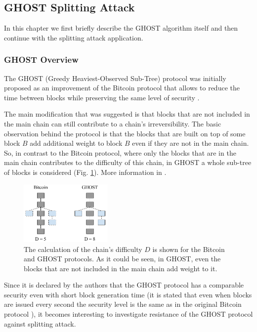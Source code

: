 \documentclass[10pt,a4paper]{article}
\numberwithin{equation}{section} %
\theoremstyle{plain}
\theoremstyle{definition}
\theoremstyle{remark}
\begin{document}
	
	\subsection{GHOST Splitting Attack}
	
	In this chapter we first briefly describe the GHOST algorithm itself and then continue with the splitting attack application.
	
	\subsubsection{GHOST Overview}
	
    The GHOST (Greedy Heaviest-Observed Sub-Tree) protocol was initially proposed as an improvement of the Bitcoin protocol that allows to reduce the time between blocks while preserving the same level of security \cite{ZS13, ZS15}.
    
    The main modification that was suggested is that blocks that are not included in the main chain can still contribute to a chain's irreversibility. The basic observation behind the protocol is that the blocks that are built on top of some block \(B\) add additional weight to block \(B\) even if they are not in the main chain. So, in contrast to the Bitcoin protocol, where only the blocks that are in the main chain contributes to the difficulty of this chain, in GHOST a whole sub-tree of blocks is considered (Fig. \ref{fig:btc_vs_ghost}). More information in \cite{ZS13,ZS15}.
    
    \begin{figure}[h!]
        \centering
        \includegraphics[width=0.4\textwidth]{btc_vs_ghost}
        \caption{The calculation of the chain's difficulty \(D\) is shown for the Bitcoin and GHOST protocols. As it could be seen, in GHOST, even the blocks that are not included in the main chain add weight to it.}
        \label{fig:btc_vs_ghost}
    \end{figure}
	
	Since it is declared by the authors that the GHOST protocol has a comparable security even with short block generation time (it is stated that even when blocks are issued every second the security level is the same as in the original Bitcoin protocol \cite{ZS13}), it becomes interesting to investigate resistance of the GHOST protocol against splitting attack.
	
\end{document}
